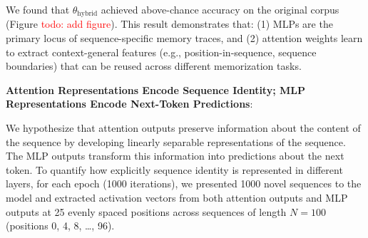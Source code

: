 \documentclass{article}
\theoremstyle{plain}
\theoremstyle{definition}
\theoremstyle{remark}
\begin{document}
We found that $\theta_{\text{hybrid}}$ achieved above-chance accuracy on the original corpus 
(Figure \textcolor{red}{todo: add figure}). 
This result demonstrates that: (1) MLPs are the primary locus of sequence-specific memory traces, 
and (2) attention weights learn to extract context-general features 
(e.g., position-in-sequence, sequence boundaries) that can be reused across different memorization tasks.
 

\textbf{Attention Representations Encode Sequence Identity; MLP Representations Encode Next-Token Predictions}:

 
We hypothesize that attention outputs preserve information about 
the content of the sequence by developing linearly separable 
representations of the sequence. 
The MLP outputs transform this information into predictions 
 about the next token.
 To quantify how explicitly sequence identity is represented in different layers, 
 for each epoch (1000 iterations), 
 we presented 1000 novel sequences to the model and extracted activation vectors 
 from both attention outputs 
 and MLP outputs at 25 evenly spaced positions across sequences of 
 length $N=100$ (positions 0, 4, 8, \ldots, 96). 
\end{document}
